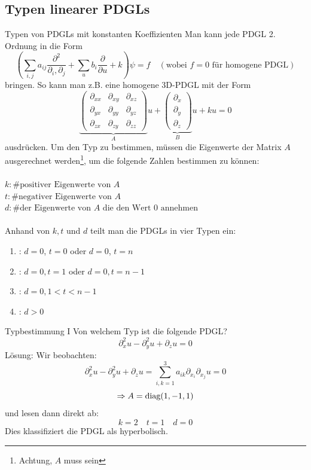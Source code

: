 \subsection{Typen linearer PDGLs}
\begin{Def}{Typen von PDGLs mit konstanten Koeffizienten}
Man kann jede PDGL 2. Ordnung in die Form $$(\sum_{i,j} a_{ij}\frac{\partial^2}{\partial_i, \partial_j}+\sum_u b_i\frac{\partial}{\partial u}+k)\psi = f \quad (\mbox{wobei $f=0$ für homogene PDGL})$$
bringen. So kann man z.B. eine homogene 3D-PDGL mit der Form
$$\underbrace{\begin{pmatrix}
    \partial_{xx} & \partial_{xy} & \partial_{xz} \\ \partial_{yx} & \partial_{yy} & \partial_{yz} \\ \partial_{zx} & \partial_{zy} & \partial_{zz}
\end{pmatrix}}_Au + \underbrace{\begin{pmatrix} \partial_x \\ \partial_y \\ \partial_z \end{pmatrix}}_B u + ku = 0$$
ausdrücken. Um den Typ zu bestimmen, müssen die Eigenwerte der Matrix $A$ ausgerechnet werden\footnote{Achtung, $A$ muss  sein}, um die folgende Zahlen bestimmen zu können: \\\\
    $k: \mbox{\# positiver Eigenwerte von $A$}$ \\
    $t: \mbox{\# negativer Eigenwerte von $A$}$ \\
    $d: \mbox{\# der Eigenwerte von $A$ die den Wert $0$ annehmen}$\\ \\
    Anhand von $k,t$ und $d$ teilt man die PDGLs in vier Typen ein:
    \begin{enumerate}
        \item {}: $d=0$, $t=0$ oder $d=0$, $t=n$
        \item {}: $d=0, t=1$ oder $d=0, t=n-1$
        \item {}: $d=0, 1<t<n-1$
        \item {}: $d>0$
    \end{enumerate}
\end{Def}
\begin{Beispiel}{Typbestimmung I}
Von welchem Typ ist die folgende PDGL?
$$\partial_x^2 u - \partial_y^2 u + \partial_z u = 0$$
Lösung: Wir beobachten:
$$\partial_x^2 u - \partial_y^2 u + \partial_z u = \sum_{i,k=1}^3 a_{ik}\partial_{x_i}\partial_{x_j} u = 0$$
$$\Rightarrow A=\text{diag}(1,-1,1)$$
und lesen dann direkt ab:
$$k=2\quad t=1\quad d=0$$
Dies klassifiziert die PDGL als hyperbolisch.
\end{Beispiel}
